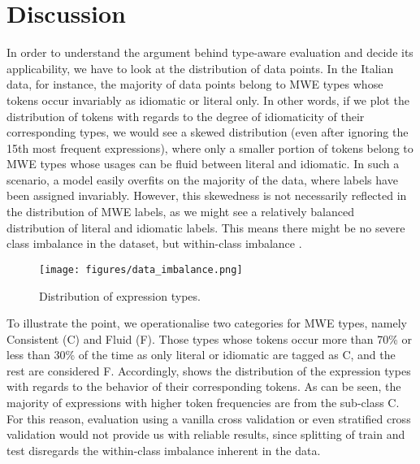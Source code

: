 \documentclass[output=paper
,modfonts
,nonflat]{langsci/langscibook}
\begin{document}
\section{Discussion}

In order to understand the argument behind type-aware evaluation and decide its applicability, we have to look at the distribution of data points. In the Italian data, for instance, the majority of data points belong to MWE types whose tokens occur invariably as idiomatic or literal only. In other words, if we plot the distribution of tokens with regards to the degree of idiomaticity of their corresponding types, we would see a skewed distribution (even after ignoring the 15th most frequent expressions), where only a smaller portion of tokens belong to MWE types whose usages can be fluid between literal and idiomatic. In such a scenario, a model easily overfits on the majority of the data, where labels have been assigned invariably. However, this skewedness is not necessarily reflected in the distribution of MWE labels, as we might see a relatively balanced distribution of literal and idiomatic labels. This means there might be no severe class imbalance in the dataset, but within-class imbalance \citep{ali2015classification}.

\begin{figure}[!htb]
\texttt{[image: figures/data\_imbalance.png]} 
\caption{Distribution of expression types.}
\label{fig:data}
\end{figure}


To illustrate the point, we operationalise two categories for MWE types, namely Consistent (C) and Fluid (F). Those types whose tokens occur more than 70\% or less than 30\% of the time as only literal or idiomatic are tagged as C, and the rest are considered F. Accordingly, %
 shows the distribution of the expression types with regards to the behavior of their corresponding tokens. As can be seen, the majority of expressions with higher token frequencies are from the sub-class C. 
For this reason, evaluation using a vanilla cross validation or even stratified cross validation would not provide us with reliable results, since splitting of train and test disregards the within-class imbalance inherent in the data. 
\end{document}
